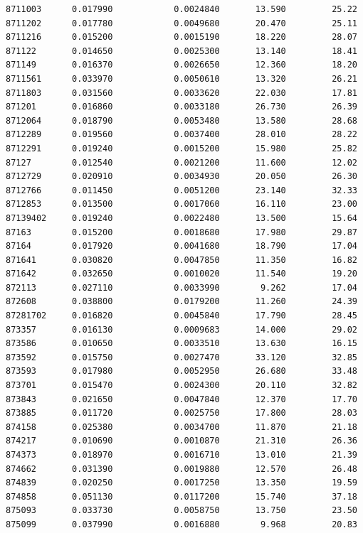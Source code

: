 \documentclass[
  letterpaper,
  DIV=11,
  numbers=noendperiod]{scrartcl}
\begin{document}
\begin{verbatim}
8711003      0.017990            0.0024840       13.590         25.22
8711202      0.017780            0.0049680       20.470         25.11
8711216      0.015200            0.0015190       18.220         28.07
871122       0.014650            0.0025300       13.140         18.41
871149       0.016370            0.0026650       12.360         18.20
8711561      0.033970            0.0050610       13.320         26.21
8711803      0.031560            0.0033620       22.030         17.81
871201       0.016860            0.0033180       26.730         26.39
8712064      0.018790            0.0053480       13.580         28.68
8712289      0.019560            0.0037400       28.010         28.22
8712291      0.019240            0.0015200       15.980         25.82
87127        0.012540            0.0021200       11.600         12.02
8712729      0.020910            0.0034930       20.050         26.30
8712766      0.011450            0.0051200       23.140         32.33
8712853      0.013500            0.0017060       16.110         23.00
87139402     0.019240            0.0022480       13.500         15.64
87163        0.015200            0.0018680       17.980         29.87
87164        0.017920            0.0041680       18.790         17.04
871641       0.030820            0.0047850       11.350         16.82
871642       0.032650            0.0010020       11.540         19.20
872113       0.027110            0.0033990        9.262         17.04
872608       0.038800            0.0179200       11.260         24.39
87281702     0.016820            0.0045840       17.790         28.45
873357       0.016130            0.0009683       14.000         29.02
873586       0.010650            0.0033510       13.630         16.15
873592       0.015750            0.0027470       33.120         32.85
873593       0.017980            0.0052950       26.680         33.48
873701       0.015470            0.0024300       20.110         32.82
873843       0.021650            0.0047840       12.370         17.70
873885       0.011720            0.0025750       17.800         28.03
874158       0.025380            0.0034700       11.870         21.18
874217       0.010690            0.0010870       21.310         26.36
874373       0.018970            0.0016710       13.010         21.39
874662       0.031390            0.0019880       12.570         26.48
874839       0.020250            0.0017250       13.350         19.59
874858       0.051130            0.0117200       15.740         37.18
875093       0.033730            0.0058750       13.750         23.50
875099       0.037990            0.0016880        9.968         20.83

\end{verbatim}
\end{document}
